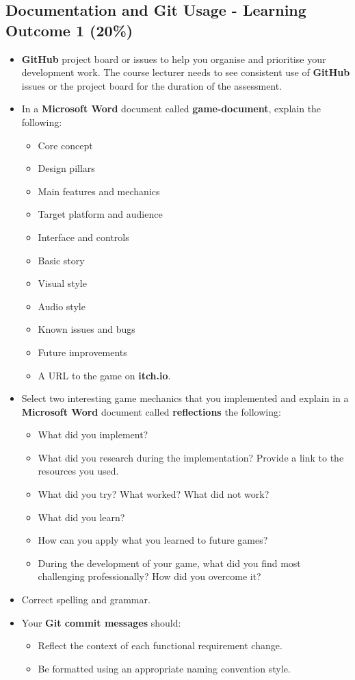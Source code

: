 \documentclass{article}
\begin{document}
\subsection*{Documentation and Git Usage - Learning Outcome 1 (20\%)}
\begin{itemize}
	\item \textbf{GitHub} project board or issues to help you organise and prioritise your development work. The course lecturer needs to see consistent use of \textbf{GitHub} issues or the project board for the duration of the assessment.
	\item In a \textbf{Microsoft Word} document called \textbf{game-document}, explain the following:
	\begin{itemize}
		\item Core concept
		\item Design pillars
		\item Main features and mechanics
		\item Target platform and audience
		\item Interface and controls
		\item Basic story
		\item Visual style
		\item Audio style
		\item Known issues and bugs
		\item Future improvements
		\item A URL to the game on \textbf{itch.io}.
	\end{itemize}
	\item Select two interesting game mechanics that you implemented and explain in a \textbf{Microsoft Word} document called \textbf{reflections} the following:
		\begin{itemize}
			\item What did you implement?
			\item What did you research during the implementation? Provide a link to the resources you used.
			\item What did you try? What worked? What did not work?
			\item What did you learn?
			\item How can you apply what you learned to future games?
			\item During the development of your game, what did you find most challenging professionally? How did you overcome it?
		\end{itemize}
    \item Correct spelling and grammar.
    \item Your \textbf{Git commit messages} should:
    \begin{itemize}
      \item Reflect the context of each functional requirement change.
      \item Be formatted using an appropriate naming convention style.
    \end{itemize}
\end{itemize} 
\end{document}
